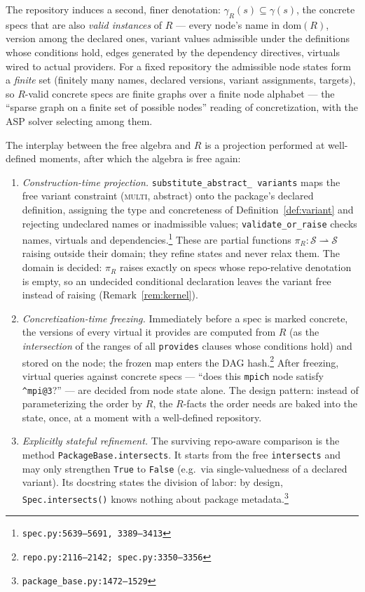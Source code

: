 \documentclass[11pt]{article}
\theoremstyle{definition}
\theoremstyle{remark}
\newcommand{\den}[1]{\gamma(#1)}
\newcommand{\denR}[1]{\gamma_{R}(#1)}
\newcommand{\Spec}{\mathcal{S}}
\newcommand{\code}[1]{\texttt{#1}}
\newcommand{\src}[1]{\footnote{\code{#1}}}
\begin{document}
The repository induces a second, finer denotation: $\denR{s} \subseteq
\den{s}$, the concrete specs that are also \emph{valid instances} of $R$ ---
every node's name in $\mathrm{dom}(R)$, version among the declared ones,
variant values admissible under the definitions whose conditions hold, edges
generated by the dependency directives, virtuals wired to actual providers.
For a fixed repository the admissible node states form a \emph{finite} set
(finitely many names, declared versions, variant assignments, targets), so
$R$-valid concrete specs are finite graphs over a finite node alphabet ---
the ``sparse graph on a finite set of possible nodes'' reading of
concretization, with the ASP solver selecting among them.

The interplay between the free algebra and $R$ is a projection performed at
well-defined moments, after which the algebra is free again:

\begin{enumerate}[itemsep=2pt]
\item \emph{Construction-time projection.}  \code{substitute\_abstract\_%
variants} maps the free variant constraint (\textsc{multi}, abstract) onto
the package's declared definition, assigning the type and concreteness of
Definition~\ref{def:variant} and rejecting undeclared names or inadmissible
values; \code{validate\_or\_raise} checks names, virtuals and
dependencies.\src{spec.py:5639--5691, 3389--3413}  These are partial
functions $\pi_R : \Spec \rightharpoonup \Spec$ raising outside their
domain; they refine states and never relax them.  The domain is decided:
$\pi_R$ raises exactly on specs whose repo-relative denotation is empty,
so an undecided conditional declaration leaves the variant free instead of
raising (Remark~\ref{rem:kernel}).
\item \emph{Concretization-time freezing.}  Immediately before a spec is
marked concrete, the versions of every virtual it provides are computed from
$R$ (as the \emph{intersection} of the ranges of all \code{provides} clauses
whose conditions hold) and stored on the node; the frozen map enters the DAG
hash.\src{repo.py:2116--2142; spec.py:3350--3356}  After freezing, virtual
queries against concrete specs --- ``does this \code{mpich} node satisfy
\code{\^{}mpi@3}?'' --- are decided from node state alone.  The design
pattern: instead of parameterizing the order by $R$, the $R$-facts the order
needs are baked into the state, once, at a moment with a well-defined
repository.
\item \emph{Explicitly stateful refinement.}  The surviving repo-aware
comparison is the method \code{PackageBase.intersects}.  It starts from the free
\code{intersects} and may only strengthen \code{True} to \code{False}
(e.g.\ via single-valuedness of a declared variant).  Its docstring states
the division of labor: by design, \code{Spec.intersects()} knows nothing
about package metadata.\src{package\_base.py:1472--1529}
\end{enumerate}
\end{document}
